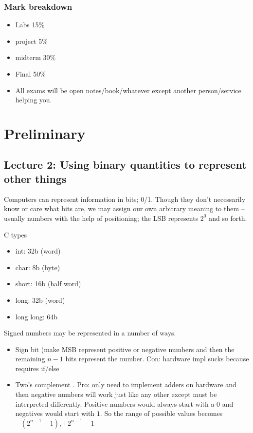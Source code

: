 \documentclass[10pt]{article}
\begin{document}
\subsubsection{Mark breakdown}

\begin{itemize}
	\item Labs 15\%
	\item project 5\%
	\item midterm  30\%
	\item Final 50\%
	\item All exams will be open notes/book/whatever except another person/service helping you.
\end{itemize}

\section{Preliminary}
\subsection{Lecture 2: Using binary quantities to represent other things}

Computers can represent information in bits; 0/1. 
Though they don't necessarily know or care what bits are, we may assign our own arbitrary meaning to them -- usually numbers with the help of positioning; the LSB represents $ 2^0 $ and so forth.

C types 
	\begin{itemize}
		\item int: 32b (word)
		\item char: 8b (byte)
		\item short: 16b (half word)
		\item long: 32b (word)
		\item long long: 64b
	\end{itemize}

Signed numbers may be represented in a number of ways.
\begin{itemize}
	\item Sign bit (make MSB represent positive or negative numbers and then the remaining $ n-1 $ bits represent the number. Con: hardware impl sucks because requires if/else
	\item Two's complement . Pro: only need to implement adders on hardware and then negative numbers will work just like any other except must be interpreted differently. Positive numbers would always start with a $ 0 $ and negatives would start with $ 1 $. So the range of possible values becomes $ -(2^{n-1}-1), +2^{n-1}-1$ 
\end{itemize}
\end{document}
